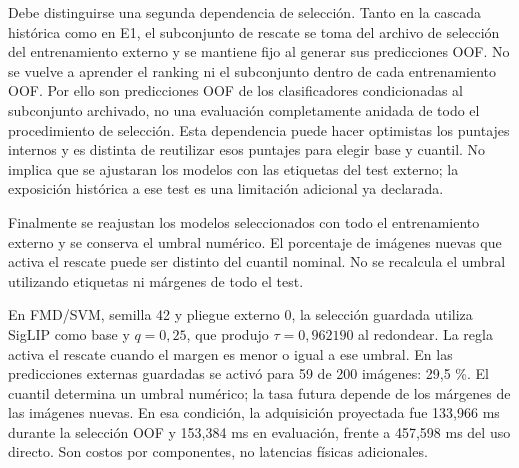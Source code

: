 Debe distinguirse una segunda dependencia de selección. Tanto en la cascada histórica como en E1, el subconjunto de rescate se toma del archivo de selección del entrenamiento externo y se mantiene fijo al generar sus predicciones OOF. No se vuelve a aprender el ranking ni el subconjunto dentro de cada entrenamiento OOF. Por ello son predicciones OOF de los clasificadores condicionadas al subconjunto archivado, no una evaluación completamente anidada de todo el procedimiento de selección. Esta dependencia puede hacer optimistas los puntajes internos y es distinta de reutilizar esos puntajes para elegir base y cuantil. No implica que se ajustaran los modelos con las etiquetas del test externo; la exposición histórica a ese test es una limitación adicional ya declarada.

Finalmente se reajustan los modelos seleccionados con todo el entrenamiento externo y se conserva el umbral numérico. El porcentaje de imágenes nuevas que activa el rescate puede ser distinto del cuantil nominal. No se recalcula el umbral utilizando etiquetas ni márgenes de todo el test.

En FMD/SVM, semilla 42 y pliegue externo 0, la selección guardada utiliza SigLIP como base y \(q=0,25\), que produjo \(\tau=0,962190\) al redondear. La regla activa el rescate cuando el margen es menor o igual a ese umbral. En las predicciones externas guardadas se activó para 59 de 200 imágenes: 29,5 \%. El cuantil determina un umbral numérico; la tasa futura depende de los márgenes de las imágenes nuevas. En esa condición, la adquisición proyectada fue 133,966 ms durante la selección OOF y 153,384 ms en evaluación, frente a 457,598 ms del uso directo. Son costos por componentes, no latencias físicas adicionales.

